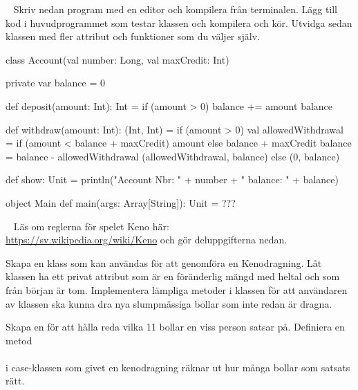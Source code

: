 {{%





\QUESTBEGIN

\Task  \what~ Skriv nedan program med en editor och kompilera från terminalen. Lägg till kod i huvudprogrammet som testar klassen  och kompilera och kör. Utvidga sedan klassen  med fler attribut och funktioner som du väljer själv.

\begin{Code}
class Account(val number: Long, val maxCredit: Int){
  private var balance = 0

  def deposit(amount: Int): Int = {
    if (amount > 0) {balance += amount}
    balance
  }

  def withdraw(amount: Int): (Int, Int) = if (amount > 0) {
    val allowedWithdrawal =
      if (amount < balance + maxCredit) amount
      else balance + maxCredit
    balance = balance - allowedWithdrawal
    (allowedWithdrawal, balance)
  } else (0, balance)

  def show: Unit =
    println("Account Nbr: " + number + " balance: " + balance)
}

object Main {
  def main(args: Array[String]): Unit = {
    ???
  }
}
\end{Code}



\SOLUTION


\QUESTEND







\QUESTBEGIN

\Task \label{task:keno-set} \what~  Läs om reglerna för spelet Keno här: \\ \url{https://sv.wikipedia.org/wiki/Keno} och gör deluppgifterna nedan.

\Subtask Skapa en klass  som kan användas för att genomföra en Kenodragning. Låt klassen ha ett privat attribut  som är en föränderlig mängd med heltal och som från början är tom. Implementera lämpliga metoder i klassen för att användaren av klassen ska kunna dra nya slumpmässiga bollar som inte redan är dragna.

\Subtask Skapa en  för att hålla reda vilka 11 bollar en viss person satsar på. Definiera en metod \\ \\ i case-klassen  som givet en kenodragning räknar ut hur många bollar som satsats rätt.

}}
